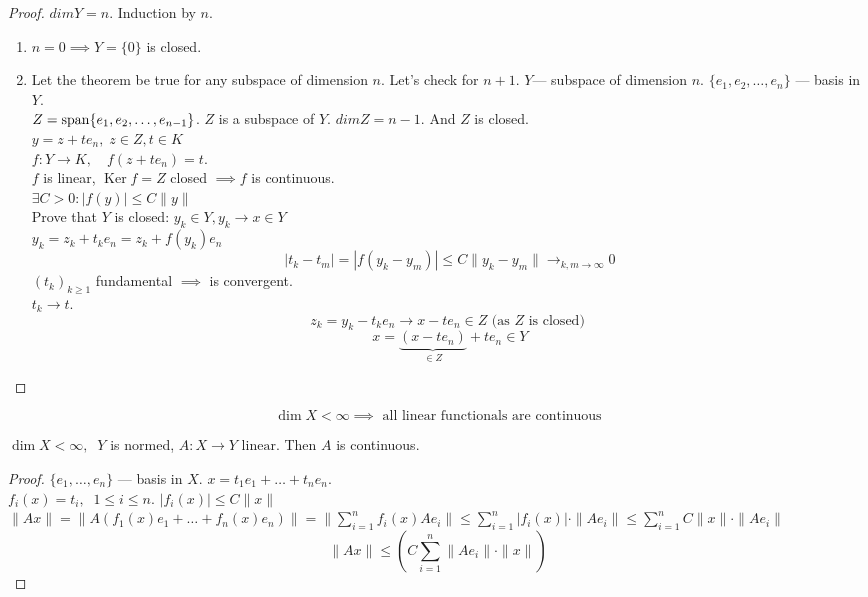  \begin{proof}
   $dim Y = n$. Induction by $n$.
   \begin{enumerate}
     \item $n = 0 \implies Y = \{0\} $ is closed.
     \item Let the theorem be true for any subspace of dimension $n$. Let's check for $n+1$.
       $Y$--- subspace of dimension $n$. $\{e_1, e_2, \ldots, e_n\} $ --- basis in $Y$.\\
       $Z = \operatorname{span} \{e_1, e_2, \ldots, e_{n-1}\} $. $Z$ is a subspace of $Y$. $dim Z = n-1$. And $Z$ is closed.\\
       $y = z + t e_n, \; z \in  Z, t \in  K$\\
       $f: Y \to  K, \quad f(z + t e_n) = t$.\\
       $f$ is linear, $\operatorname{Ker} f = Z$ closed $\implies f$ is continuous.\\
       $\exists C > 0 : \left| f(y) \right| \le  C \|y\|$ \\

       Prove that $Y$ is closed: $y_k \in  Y, y_k \to x \in  Y$\\
        $y_k = z_k + t_k e_n = z_k + f(y_k) e_n$\\
         $$\left| t_k - t_m \right| = \left| f(y_k - y_m) \right| \le  C \|y_k - y_m\| \to_{k,m \to  \infty} 0$$
         $\left( t_k \right) _{k\ge 1}$ fundamental $\implies$ is convergent.\\
         $t_k \to  t$.\\
         \[ z_k = y_k - t_k e_n \to x - t e_n \in Z \text{ (as $Z$ is closed) } \] 
         \[ x = \underbrace{\left( x - t e_n \right)}_{\in Z} + t e_n \in Y \] 
   \end{enumerate}
 \end{proof}


 \begin{corollary}
   \[ \operatorname{dim} X < \infty \implies \text{ all linear functionals are continuous} \] 
 \end{corollary}

 \begin{corollary}
   $ \operatorname{dim} X < \infty, \;\; Y$ is normed, $ A: X \to Y \text{ linear}$.
 Then $A$ is continuous.
 \end{corollary}

 \begin{proof}
   $\{e_1, \ldots, e_n\} $ --- basis in $X$. $x = t_1 e_1 + \ldots + t_n e_n$.\\
   $f_i(x) = t_i, \;\; 1 \le  i \le  n$. $\left| f_i(x) \right|  \le C \|x\|$ \\
   $\|A x\| = \|A\left( f_1(x) e_1 + \ldots + f_n(x) e_n \right) \| = \|\sum_{i=1}^{n} f_i(x) A e_i\| \le \sum_{i=1}^{n} \left| f_i(x) \right| \cdot \|A e_i\| \le  \sum_{i=1}^{n} C \|x\|\cdot \|A e_i\| $
    \[ \|A x\| \le  \left( C \sum_{i=1}^{n} \|A e_i\|\cdot \|x\| \right)  \] 
 \end{proof}


